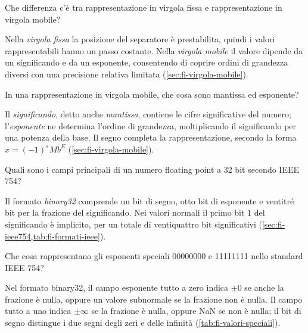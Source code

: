 \begin{exercise}
\label{ex:fi-rappresentazione-fissa-mobile}
Che differenza c'è tra rappresentazione in virgola fissa e
rappresentazione in virgola mobile?
\end{exercise}

Nella \emph{virgola fissa} la posizione del separatore è prestabilita,
quindi i valori rappresentabili hanno un passo costante. Nella
\emph{virgola mobile} il valore dipende da un significando e da
un esponente, consentendo di coprire ordini di grandezza diversi
con una precisione relativa limitata
(\cref{sec:fi-virgola-mobile}).

\begin{exercise}
\label{ex:fi-rappresentazione-mantissa-esponente}
In una rappresentazione in virgola mobile, che cosa sono mantissa
ed esponente?
\end{exercise}

Il \emph{significando}, detto anche \emph{mantissa}, contiene le cifre
significative del numero; l'\emph{esponente} ne determina l'ordine
di grandezza, moltiplicando il significando per una potenza della
base. Il segno completa la rappresentazione, secondo la forma
\(x=(-1)^sMb^E\) (\cref{sec:fi-virgola-mobile}).

\begin{exercise}
\label{ex:fi-rappresentazione-ieee32-campi}
Quali sono i campi principali di un numero floating point a 32 bit
secondo IEEE 754?
\end{exercise}

Il formato \emph{binary32} comprende un bit di segno, otto bit
di esponente e ventitré bit per la frazione del significando.
Nei valori normali il primo bit \(1\) del significando è implicito,
per un totale di ventiquattro bit significativi
(\cref{sec:fi-ieee754,tab:fi-formati-ieee}).

\begin{exercise}
\label{ex:fi-rappresentazione-ieee32-esponenti-speciali}
Che cosa rappresentano gli esponenti speciali 00000000 e 11111111
nello standard IEEE 754?
\end{exercise}

Nel formato binary32, il campo esponente tutto a zero indica
\(\pm0\) se anche la frazione è nulla, oppure un valore subnormale
se la frazione non è nulla. Il campo tutto a uno indica \(\pm\infty\)
se la frazione è nulla, oppure NaN se non è nulla; il bit di segno
distingue i due segni degli zeri e delle infinità
(\cref{tab:fi-valori-speciali}).


